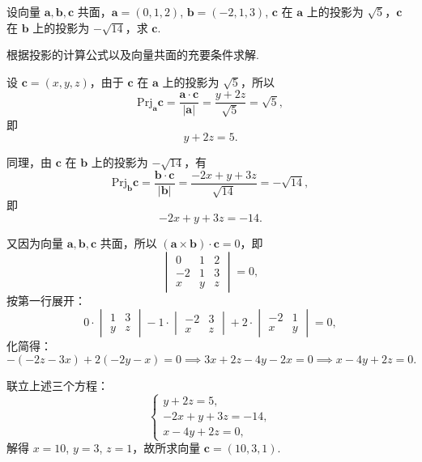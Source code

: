 \begin{problem}
    设向量 $\boldsymbol{a},\boldsymbol{b},\boldsymbol{c}$ 共面，$\boldsymbol{a} = (0,1,2)$, $\boldsymbol{b} = (-2,1,3)$, $\boldsymbol{c}$ 在 $\boldsymbol{a}$ 上的投影为 $\sqrt{5}$，$\boldsymbol{c}$ 在 $\boldsymbol{b}$ 上的投影为 $-\sqrt{14}$，求 $\boldsymbol{c}$.
\end{problem}
\begin{note}
    根据投影的计算公式以及向量共面的充要条件求解.
\end{note}
 \begin{solution}
     设 $\boldsymbol{c} = (x,y,z)$，由于 $\boldsymbol{c}$ 在 $\boldsymbol{a}$ 上的投影为 $\sqrt{5}$，所以
\[
\text{Prj}_{\boldsymbol{a}} \boldsymbol{c} = \frac{\boldsymbol{a} \cdot \boldsymbol{c}}{|\boldsymbol{a}|} = \frac{y + 2z}{\sqrt{5}} = \sqrt{5},
\]
即
\[
y + 2z = 5.
\]

同理，由 $\boldsymbol{c}$ 在 $\boldsymbol{b}$ 上的投影为 $-\sqrt{14}$，有
\[
\text{Prj}_{\boldsymbol{b}} \boldsymbol{c} = \frac{\boldsymbol{b} \cdot \boldsymbol{c}}{|\boldsymbol{b}|} = \frac{-2x + y + 3z}{\sqrt{14}} = -\sqrt{14},
\]
即
\[
-2x + y + 3z = -14.
\]

又因为向量 $\boldsymbol{a},\boldsymbol{b},\boldsymbol{c}$ 共面，所以 $(\boldsymbol{a} \times \boldsymbol{b}) \cdot \boldsymbol{c} = 0$，即
\[
\begin{vmatrix}
0 & 1 & 2 \\
-2 & 1 & 3 \\
x & y & z
\end{vmatrix} = 0,
\]
按第一行展开：
\[
0 \cdot \begin{vmatrix}1 & 3 \\ y & z\end{vmatrix}
- 1 \cdot \begin{vmatrix}-2 & 3 \\ x & z\end{vmatrix}
+ 2 \cdot \begin{vmatrix}-2 & 1 \\ x & y\end{vmatrix} = 0,
\]
化简得：
\[
-(-2z - 3x) + 2(-2y - x) = 0 \implies 3x + 2z - 4y - 2x = 0 \implies x - 4y + 2z = 0.
\]

联立上述三个方程：
\[
\begin{cases}
y + 2z = 5, \\
-2x + y + 3z = -14, \\
x - 4y + 2z = 0,
\end{cases}
\]
解得 $x = 10$, $y = 3$, $z = 1$，故所求向量 $\boldsymbol{c} = (10,3,1)$.
 \end{solution}
